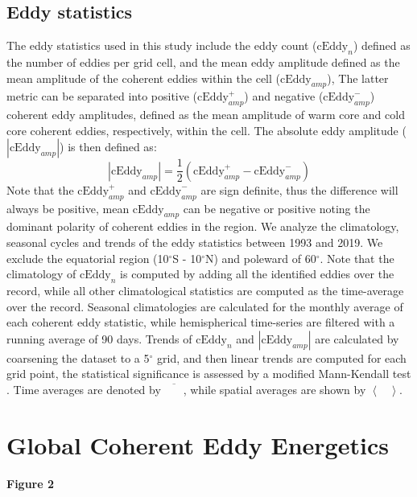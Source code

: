 \documentclass[draft,linenumbers]{agujournal2019}
\begin{document}
	\subsection{Eddy statistics}

	The eddy statistics used in this study include the eddy count ($\mathrm{cEddy}_{n}$) defined as the number of eddies per grid cell, and the mean eddy amplitude defined as the mean amplitude of the coherent eddies within the cell ($\mathrm{cEddy}_{amp}$), The latter metric can be separated into positive ($\mathrm{cEddy}_{amp}^{+}$) and negative ($\mathrm{cEddy}_{amp}^{-}$) coherent eddy amplitudes, defined as the mean amplitude of warm core and cold core coherent eddies, respectively, within the cell. 
	The absolute eddy amplitude ($|\mathrm{cEddy}_{amp}|$) is then defined as:
	\begin{equation}
	|\mathrm{cEddy}_{amp}| = \frac{1}{2} \left(\mathrm{cEddy}_{amp}^{+} -  \mathrm{cEddy}_{amp}^{-} \right)
	\end{equation}
	Note that the $\mathrm{cEddy}_{amp}^{+}$ and $\mathrm{cEddy}_{amp}^{-}$ are sign definite, thus the difference will always be positive, mean $\mathrm{cEddy}_{amp}$ can be negative or positive noting the dominant polarity of coherent eddies in the region. We analyze the climatology, seasonal cycles and trends of the eddy statistics between 1993 and 2019. We exclude the equatorial region (10$^\circ$S - 10$^\circ$N) and poleward of 60$^\circ$. Note that the climatology of $\mathrm{cEddy}_{n}$ is computed by adding all the identified eddies over the record, while all other climatological statistics are computed as the time-average over the record.  Seasonal climatologies are calculated for the monthly average of each coherent eddy statistic, while hemispherical time-series are filtered with a running average of 90 days. Trends of $\mathrm{cEddy}_{n}$ and $|\mathrm{cEddy}_{amp}|$ are calculated by coarsening the dataset to a 5$^\circ$ grid, and then linear trends are computed for each grid point, the statistical significance is assessed by a modified Mann-Kendall test \citep{Sheng_MK_2004}. Time averages are denoted by $\overline{\phantom{XX}}$, while spatial averages are shown by $\left< \phantom{X}\right>$.

	\section{Global Coherent Eddy Energetics}
	\label{subsec:CEKE_climatology}

	\textbf{Figure 2}
\end{document}
